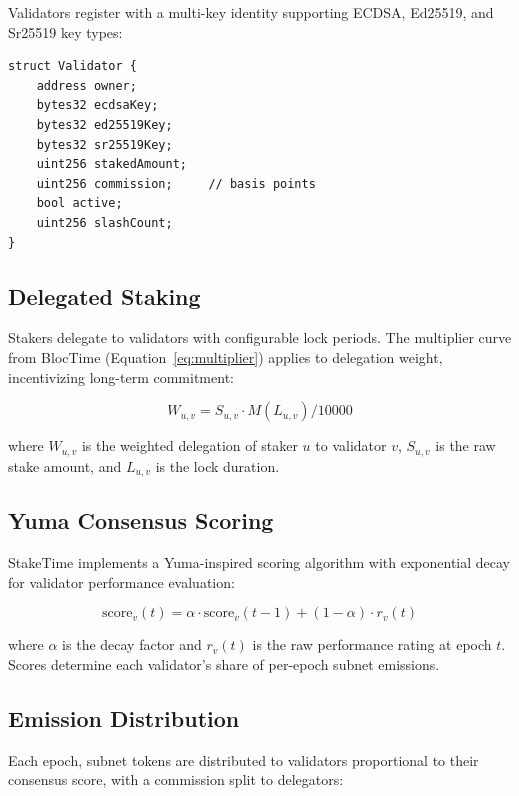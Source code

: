 \documentclass[11pt,a4paper]{article}
\begin{document}
Validators register with a multi-key identity supporting ECDSA, Ed25519, and Sr25519 key types:

\begin{lstlisting}[style=solidity]
struct Validator {
    address owner;
    bytes32 ecdsaKey;
    bytes32 ed25519Key;
    bytes32 sr25519Key;
    uint256 stakedAmount;
    uint256 commission;     // basis points
    bool active;
    uint256 slashCount;
}
\end{lstlisting}

\subsection{Delegated Staking}

Stakers delegate to validators with configurable lock periods. The multiplier curve from BlocTime (Equation~\ref{eq:multiplier}) applies to delegation weight, incentivizing long-term commitment:

\begin{equation}
W_{u,v} = S_{u,v} \cdot M(L_{u,v}) / 10000
\label{eq:delegation}
\end{equation}

where $W_{u,v}$ is the weighted delegation of staker $u$ to validator $v$, $S_{u,v}$ is the raw stake amount, and $L_{u,v}$ is the lock duration.

\subsection{Yuma Consensus Scoring}

StakeTime implements a Yuma-inspired scoring algorithm with exponential decay for validator performance evaluation:

\begin{equation}
\text{score}_v(t) = \alpha \cdot \text{score}_v(t-1) + (1 - \alpha) \cdot r_v(t)
\label{eq:yuma}
\end{equation}

where $\alpha$ is the decay factor and $r_v(t)$ is the raw performance rating at epoch $t$. Scores determine each validator's share of per-epoch subnet emissions.

\subsection{Emission Distribution}

Each epoch, subnet tokens are distributed to validators proportional to their consensus score, with a commission split to delegators:
\end{document}
